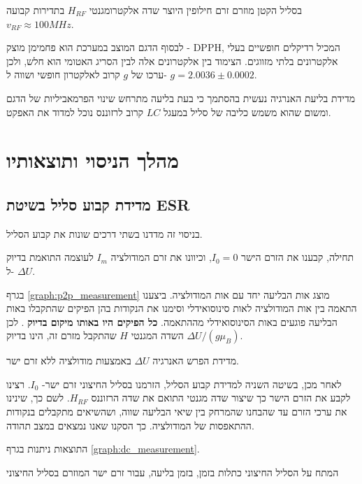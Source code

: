 \documentclass{article}
\begin{document}
בסליל הקטן מוזרם זרם חילופין היוצר שדה אלקטרומגנטי 
$H_{RF}$
בתדירות קבועה
$v_{RF} \approx 100 MHz$.

לבסוף הדגם המוצב במערכת הוא פחמימן מוצק -
\textenglish{DPPH},
המכיל רדיקלים חופשיים בעלי אלקטרונים בלתי מזווגים.
הצימוד בין אלקטרונים אלה לבין הסריג האטומי הוא חלש, ולכן ערכו של
$g$
קרוב לאלקטרון חופשי ושווה ל-
$g = 2.0036 \pm 0.0002$.


מדידת בליעת האנרגיה נעשית בהסתמך כי בעת בליעה מתרחש שינוי הפרמאביליות של הדגם ומשום שהוא משמש כליבה של סליל במעגל
$LC$
קרוב לרזוננס נוכל למדוד את האפקט.
\section{מהלך הניסוי ותוצאותיו}
\subsection{מדידת קבוע סליל בשיטת ESR }
בניסוי זה מדדנו בשתי דרכים שונות את קבוע הסליל.


תחילה, קבענו את הזרם הישר
$I_0 = 0$,
וכיוונו את זרם המודולציה
$I_m$
לעוצמה התואמת בדיוק ל-
$\Delta U$.

בגרף 
\ref{graph:p2p_measurement}
מוצג אות הבליעה יחד עם אות המודולציה.
ביצענו התאמה בין אות המודולציה לאות סינוסואידלי וסימנו את הנקודות בהן הפיקים שהתקבלו באות הבליעה פוגעים באות הסינוסואידלי מההתאמה.
\textbf{
כל הפיקים היו באותו מיקום בדיוק 
}.
לכן השדה המגנטי
$H$
שהתקבל מזרם זה, הינו בדיוק
$\Delta U / (g \mu_B)$.

\begin{graph}[H]
	\begin{center}
	\resizebox{\textwidth}{!}{}
	\end{center}
	\caption{
	מדידת הפרש האנרגיה
	$\Delta U$
	באמצעות מודולציה ללא זרם ישר.
	}
\label{graph:p2p_measurement}
\end{graph}

לאחר מכן, בשיטה השניה למדידת קבוע הסליל,  הזרמנו בסליל החיצוני זרם ישר-
$I_0$.
רצינו לקבע את הזרם הישר כך שיצור שדה מגנטי התואם את שדה הרזוננס
$H_{RF}$.
לשם כך, שינינו את ערכי הזרם עד שהבחנו שהמרחק בין שיאי הבליעה שווה, ושהשיאים מתקבלים בנקודות ההתאפסות של המודולציה.
כך הסקנו שאנו נמצאים במצב תהודה.

התוצאות ניתנות בגרף  
\ref{graph:dc_measurement}.

\begin{graph}[H]
	\begin{center}
	\resizebox{\textwidth}{!}{}
	\end{center}
	\caption{
	המתח על הסליל החיצוני כתלות בזמן, בזמן בליעה, עבור זרם ישר המוזרם בסליל החיצוני
	}
\label{graph:dc_measurement}
\end{graph}





\end{document}
